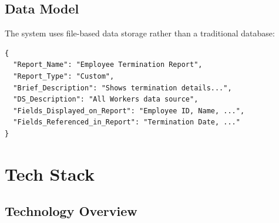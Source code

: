\documentclass[12pt,a4paper]{article}
\begin{document}
\subsection{Data Model}
\label{subsec:data-model}

The system uses file-based data storage rather than a traditional database:

\begin{lstlisting}[caption={Report Catalog JSON Schema (per entry)}, label={lst:report-schema}, language={}]
{
  "Report_Name": "Employee Termination Report",
  "Report_Type": "Custom",
  "Brief_Description": "Shows termination details...",
  "DS_Description": "All Workers data source",
  "Fields_Displayed_on_Report": "Employee ID, Name, ...",
  "Fields_Referenced_in_Report": "Termination Date, ..."
}
\end{lstlisting}

\section{Tech Stack}
\label{sec:tech-stack}

\subsection{Technology Overview}
\label{subsec:tech-overview}
\end{document}
